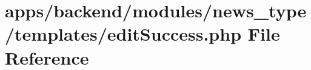 \hypertarget{backend_2modules_2news__type_2templates_2edit_success_8php}{\section{apps/backend/modules/news\-\_\-type/templates/edit\-Success.php File Reference}
\label{backend_2modules_2news__type_2templates_2edit_success_8php}
}
